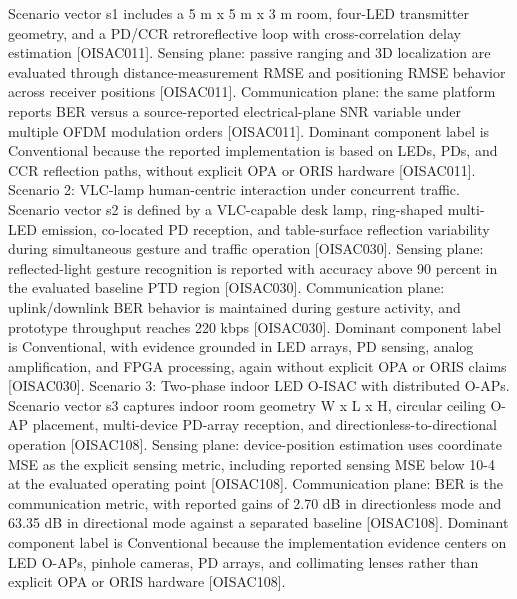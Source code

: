 {}Scenario vector s1 includes a 5 m x 5 m x 3 m room, four-LED transmitter geometry, and a PD/CCR retroreflective loop with cross-correlation delay estimation [O\markdownRendererUnderscore{}ISAC\markdownRendererUnderscore{}011]. Sensing plane: passive ranging and 3D localization are evaluated through distance-measurement RMSE and positioning RMSE behavior across receiver positions [O\markdownRendererUnderscore{}ISAC\markdownRendererUnderscore{}011]. Communication plane: the same platform reports BER versus a source-reported electrical-plane SNR variable under multiple OFDM modulation orders [O\markdownRendererUnderscore{}ISAC\markdownRendererUnderscore{}011]. Dominant component label is Conventional because the reported implementation is based on LEDs, PDs, and CCR reflection paths, without explicit OPA or ORIS hardware [O\markdownRendererUnderscore{}ISAC\markdownRendererUnderscore{}011].\markdownRendererParagraphSeparator
{}Scenario 2: VLC-lamp human-centric interaction under concurrent traffic.\markdownRendererHardLineBreak
{}Scenario vector s2 is defined by a VLC-capable desk lamp, ring-shaped multi-LED emission, co-located PD reception, and table-surface reflection variability during simultaneous gesture and traffic operation [O\markdownRendererUnderscore{}ISAC\markdownRendererUnderscore{}030]. Sensing plane: reflected-light gesture recognition is reported with accuracy above 90 percent in the evaluated baseline PTD region [O\markdownRendererUnderscore{}ISAC\markdownRendererUnderscore{}030]. Communication plane: uplink/downlink BER behavior is maintained during gesture activity, and prototype throughput reaches 220 kbps [O\markdownRendererUnderscore{}ISAC\markdownRendererUnderscore{}030]. Dominant component label is Conventional, with evidence grounded in LED arrays, PD sensing, analog amplification, and FPGA processing, again without explicit OPA or ORIS claims [O\markdownRendererUnderscore{}ISAC\markdownRendererUnderscore{}030].\markdownRendererParagraphSeparator
{}Scenario 3: Two-phase indoor LED O-ISAC with distributed O-APs.\markdownRendererHardLineBreak
{}Scenario vector s3 captures indoor room geometry W x L x H, circular ceiling O-AP placement, multi-device PD-array reception, and directionless-to-directional operation [O\markdownRendererUnderscore{}ISAC\markdownRendererUnderscore{}108]. Sensing plane: device-position estimation uses coordinate MSE as the explicit sensing metric, including reported sensing MSE below 10\markdownRendererCircumflex{}-4 at the evaluated operating point [O\markdownRendererUnderscore{}ISAC\markdownRendererUnderscore{}108]. Communication plane: BER is the communication metric, with reported gains of 2.70 dB in directionless mode and 63.35 dB in directional mode against a separated baseline [O\markdownRendererUnderscore{}ISAC\markdownRendererUnderscore{}108]. Dominant component label is Conventional because the implementation evidence centers on LED O-APs, pinhole cameras, PD arrays, and collimating lenses rather than explicit OPA or ORIS hardware [O\markdownRendererUnderscore{}ISAC\markdownRendererUnderscore{}108].\markdownRendererParagraphSeparator
